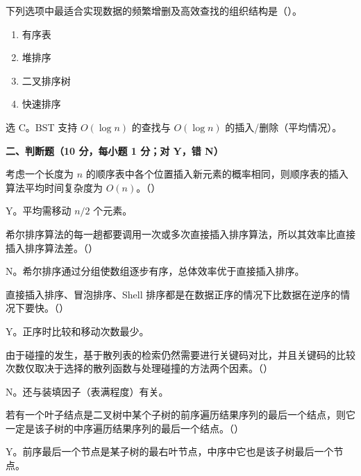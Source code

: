 \begin{question}
下列选项中最适合实现数据的频繁增删及高效查找的组织结构是（\quad）。
\begin{enumerate}
  \item 有序表
  \item 堆排序
  \item 二叉排序树
  \item 快速排序
\end{enumerate}
\begin{solution}
选 C。BST 支持 $O(\log n)$ 的查找与 $O(\log n)$ 的插入/删除（平均情况）。
\end{solution}
\end{question}

\clearpage

\textbf{二、判断题（10 分，每小题 1 分；对 Y，错 N）}

\begin{question}
考虑一个长度为 $n$ 的顺序表中各个位置插入新元素的概率相同，则顺序表的插入算法平均时间复杂度为 $O(n)$。（\quad）
\begin{solution}
Y。平均需移动 $n/2$ 个元素。
\end{solution}
\end{question}

\begin{question}
希尔排序算法的每一趟都要调用一次或多次直接插入排序算法，所以其效率比直接插入排序算法差。（\quad）
\begin{solution}
N。希尔排序通过分组使数组逐步有序，总体效率优于直接插入排序。
\end{solution}
\end{question}

\begin{question}
直接插入排序、冒泡排序、Shell 排序都是在数据正序的情况下比数据在逆序的情况下要快。（\quad）
\begin{solution}
Y。正序时比较和移动次数最少。
\end{solution}
\end{question}

\begin{question}
由于碰撞的发生，基于散列表的检索仍然需要进行关键码对比，并且关键码的比较次数仅取决于选择的散列函数与处理碰撞的方法两个因素。（\quad）
\begin{solution}
N。还与装填因子（表满程度）有关。
\end{solution}
\end{question}

\begin{question}
若有一个叶子结点是二叉树中某个子树的前序遍历结果序列的最后一个结点，则它一定是该子树的中序遍历结果序列的最后一个结点。（\quad）
\begin{solution}
Y。前序最后一个节点是某子树的最右叶节点，中序中它也是该子树最后一个节点。
\end{solution}
\end{question}

